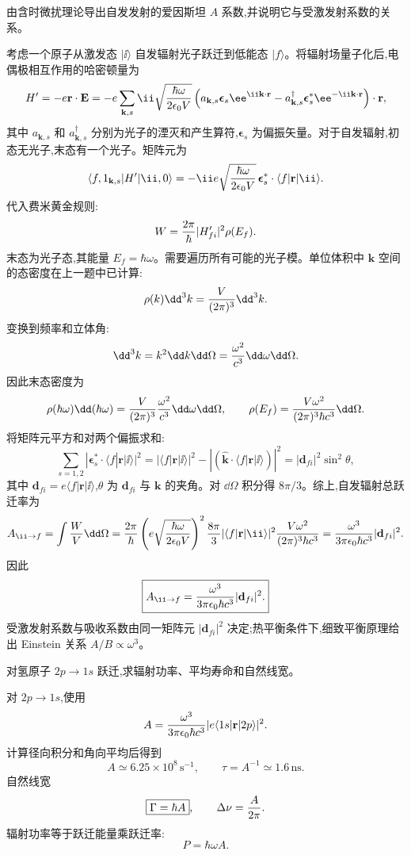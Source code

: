 \begin{question}
由含时微扰理论导出自发发射的爱因斯坦 $A$ 系数,并说明它与受激发射系数的关系。
\end{question}
\begin{solution}
考虑一个原子从激发态 $|\ii\rangle$ 自发辐射光子跃迁到低能态 $|f\rangle$。将辐射场量子化后,电偶极相互作用的哈密顿量为
\[
H'=-e\mathbf r\cdot\mathbf E=-e\sum_{\mathbf k,s}\ii\sqrt{\hbar\omega\over2\epsilon_0 V}
\left(a_{\mathbf k,s}\boldsymbol\epsilon_s\ee^{\ii\mathbf k\cdot\mathbf r}-a^\dagger_{\mathbf k,s}\boldsymbol\epsilon_s^* \ee^{-\ii\mathbf k\cdot\mathbf r}\right)\cdot\mathbf r,
\]
其中 $a_{\mathbf k,s}$ 和 $a^\dagger_{\mathbf k,s}$ 分别为光子的湮灭和产生算符,$\boldsymbol\epsilon_s$ 为偏振矢量。对于自发辐射,初态无光子,末态有一个光子。矩阵元为
\[
\langle f,1_{\mathbf k,s}|H'|\ii,0\rangle
=-\ii e\sqrt{\hbar\omega\over2\epsilon_0 V}\,\boldsymbol\epsilon_s^*\cdot\langle f|\mathbf r|\ii\rangle.
\]
代入费米黄金规则:
\[
W={2\pi\over\hbar}|H'_{fi}|^2\rho(E_f).
\]
末态为光子态,其能量 $E_f=\hbar\omega$。需要遍历所有可能的光子模。单位体积中 $\mathbf k$ 空间的态密度在上一题中已计算:
\[
\rho(k)\dd^3k={V\over(2\pi)^3}\dd^3k.
\]
变换到频率和立体角:
\[
\dd^3k=k^2\dd k\dd\Omega={\omega^2\over c^3}\dd\omega\dd\Omega.
\]
因此末态密度为
\[
\rho(\hbar\omega)\dd(\hbar\omega)={V\over(2\pi)^3}{\omega^2\over c^3}\dd\omega\dd\Omega,
\qquad
\rho(E_f)={V\omega^2\over(2\pi)^3\hbar c^3}\dd\Omega.
\]
将矩阵元平方和对两个偏振求和:
\[
\sum_{s=1,2}|\boldsymbol\epsilon_s^*\cdot\langle f|\mathbf r|\ii\rangle|^2
=|\langle f|\mathbf r|\ii\rangle|^2-|(\hat{\mathbf k}\cdot\langle f|\mathbf r|\ii\rangle)|^2
=|\mathbf d_{fi}|^2\sin^2\theta,
\]
其中 $\mathbf d_{fi}=e\langle f|\mathbf r|\ii\rangle$,$\theta$ 为 $\mathbf d_{fi}$ 与 $\mathbf k$ 的夹角。对 $\dd\Omega$ 积分得 $8\pi/3$。综上,自发辐射总跃迁率为
\[
A_{\ii\to f}=\int{W\over V}\dd\Omega
={2\pi\over\hbar}\left(e\sqrt{\hbar\omega\over2\epsilon_0 V}\right)^2
{8\pi\over3}|\langle f|\mathbf r|\ii\rangle|^2{V\omega^2\over(2\pi)^3\hbar c^3}
={\omega^3\over3\pi\epsilon_0\hbar c^3}|\mathbf d_{fi}|^2.
\]
因此
\[
\boxed{A_{\ii\to f}={\omega^3\over3\pi\epsilon_0\hbar c^3}|\mathbf d_{fi}|^2.}
\]
受激发射系数与吸收系数由同一矩阵元 $|\mathbf d_{fi}|^2$ 决定;热平衡条件下,细致平衡原理给出 Einstein 关系 $A/B\propto\omega^3$。
\end{solution}

\begin{question}
对氢原子 $2p\to1s$ 跃迁,求辐射功率、平均寿命和自然线宽。
\end{question}
\begin{solution}
对 $2p\to1s$,使用
\[
A={\omega^3\over3\pi\epsilon_0\hbar c^3}|e\langle1s|\mathbf r|2p\rangle|^2.
\]
计算径向积分和角向平均后得到
\[
\boxed{A\simeq6.25\times10^8\,\mathrm{s}^{-1}},\qquad
\boxed{\tau=A^{-1}\simeq1.6\,\mathrm{ns}}.
\]
自然线宽
\[
\boxed{\Gamma=\hbar A},\qquad
\Delta\nu={A\over2\pi}.
\]
辐射功率等于跃迁能量乘跃迁率:
\[
\boxed{P=\hbar\omega A}.
\]
\end{solution}

